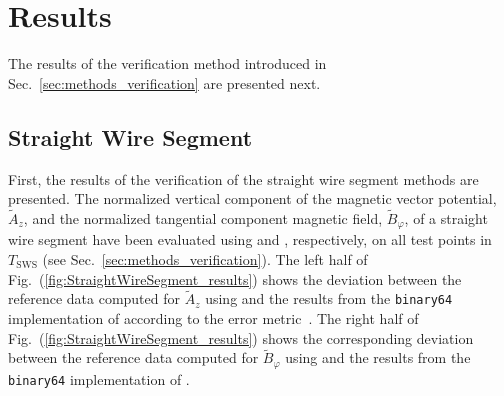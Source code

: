 \section{Results}
\label{sec:results}
The results of the verification method introduced in Sec.~\ref{sec:methods_verification}
are presented next.
\subsection{Straight Wire Segment}
First, the results of the verification of the straight wire segment methods are presented.
The normalized vertical component of the magnetic vector potential, $\tilde{A}_z$,
and the normalized tangential component magnetic field, $\tilde{B}_\varphi$, of a straight wire segment
have been evaluated using  and , respectively,
on all test points in $T_\mathrm{SWS}$ (see Sec.~\ref{sec:methods_verification}).
The left half of Fig.~(\ref{fig:StraightWireSegment_results}) shows the deviation
between the reference data computed for $\tilde{A}_z$ using 
and the results from the \texttt{binary64} implementation of 
according to the error metric~.
The right half of Fig.~(\ref{fig:StraightWireSegment_results}) shows the corresponding deviation
between the reference data computed for $\tilde{B}_\varphi$ using 
and the results from the \texttt{binary64} implementation of .
